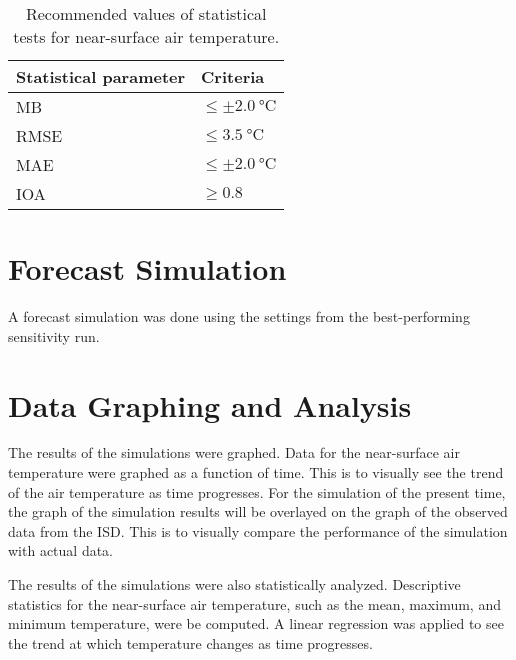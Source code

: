 	\begin{table}	
		\caption{Recommended values of statistical tests for near-surface air temperature.}
		\label{tab:performance-statistics-threshold}
		\centering
		\begin{tabular}{l l}
			\hline \hline
			Statistical parameter & Criteria\\
			\hline
			MB & $\leq \pm \qty{2.0}{\degreeCelsius}$ \\
			RMSE & $\leq \qty{3.5}{\degreeCelsius}$\\
			MAE & $\leq \pm \qty{2.0}{\degreeCelsius}$\\
			IOA	& $\geq \num{0.8}$\\
			\hline
		\end{tabular}		
	\end{table}

\section{Forecast Simulation}
	A forecast simulation was done using the settings from the best-performing sensitivity run.

\section{Data Graphing and Analysis}
	The results of the simulations were graphed.
	Data for the near-surface air temperature were graphed as a function of time.
	This is to visually see the trend of the air temperature as time progresses.
	For the simulation of the present time, the graph of the simulation results will be overlayed on the graph of the observed data from the ISD.
	This is to visually compare the performance of the simulation with actual data.
	
	The results of the simulations were also statistically analyzed.
	Descriptive statistics for the near-surface air temperature, such as the mean, maximum, and minimum temperature, were be computed.
	A linear regression was applied to see the trend at which temperature changes as time progresses.